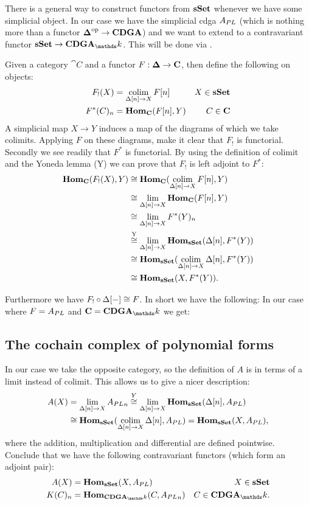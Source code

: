 
There is a general way to construct functors from $\mathbf{s{\mathbf{Set}}}$ whenever we have some simplicial object. In our case we have the simplicial cdga ${A_{PL}}$ (which is nothing more than a functor ${\boldsymbol{\Delta}}^{\text{op}} \to \mathbf{CDGA}$) and we want to extend to a contravariant functor $\sSet \to \CDGA_\k$. This will be done via .

Given a category $\cat{C}$ and a functor $F: \boldsymbol{\Delta} \to \mathbf{C}$, then define the following on objects:
\begin{align*}
	F_!(X)      &= \operatorname*{colim}_{\Delta[n] \to X} F[n] & X \in \mathbf{s{\mathbf{Set}}} \\
	F^\ast(C)_n &= \mathbf{Hom}_{\mathbf{C}}(F[n], Y)       & C \in \mathbf{C}
\end{align*}
A simplicial map $X \to Y$ induces a map of the diagrams of which we take colimits. Applying $F$ on these diagrams, make it clear that $F_!$ is functorial. Secondly we see readily that $F^\ast$ is functorial. By using the definition of colimit and the Yoneda lemma (Y) we can prove that $F_!$ is left adjoint to $F^\ast$:
\begin{align*}
	\mathbf{Hom}_{\mathbf{C}}(F_!(X), Y)
	&\cong \mathbf{Hom}_{\mathbf{C}}(\operatorname*{colim}_{\Delta[n] \to X} F[n], Y) \\
	&\cong \lim_{\Delta[n] \to X} \mathbf{Hom}_{\mathbf{C}}(F[n], Y) \\
	&\cong \lim_{\Delta[n] \to X} F^\ast(Y)_n \\
	&\stackrel{\text{Y}}{\cong} \lim_{\Delta[n] \to X} \mathbf{Hom}_{\mathbf{s{\mathbf{Set}}}}(\Delta[n], F^\ast(Y)) \\
	&\cong \mathbf{Hom}_{\mathbf{s{\mathbf{Set}}}}(\operatorname*{colim}_{\Delta[n] \to X} \Delta[n], F^\ast(Y)) \\
	&\cong \mathbf{Hom}_{\mathbf{s{\mathbf{Set}}}}(X, F^\ast(Y)).
\end{align*}

Furthermore we have $F_! \circ \Delta[-] \cong F$. In short we have the following:
In our case where $F = {A_{PL}}$ and $\cat{C} = \CDGA_\k$ we get:


\subsection{The cochain complex of polynomial forms}

In our case we take the opposite category, so the definition of $A$ is in terms of a limit instead of colimit. This allows us to give a nicer description:
\begin{align*}
	A(X)
	&= \lim_{\Delta[n] \to X} {A_{PL}}_n 
	\stackrel{Y}{\cong} \lim_{\Delta[n] \to X} \mathbf{Hom}_{\mathbf{s{\mathbf{Set}}}}(\Delta[n], {A_{PL}}) \\
	&\cong \mathbf{Hom}_{\mathbf{s{\mathbf{Set}}}}(\operatorname*{colim}_{\Delta[n] \to X}\Delta[n], {A_{PL}})
	= \mathbf{Hom}_{\mathbf{s{\mathbf{Set}}}}(X, {A_{PL}}),
\end{align*}
where the addition, multiplication and differential are defined pointwise. Conclude that we have the following contravariant functors (which form an adjoint pair):
\begin{align*}
	A(X) &= \Hom_\sSet(X, \Apl) & X \in \sSet \\
	K(C)_n &= \Hom_{\CDGA_\k}(C, \Apl_n) & C \in \CDGA_\k.
\end{align*}


